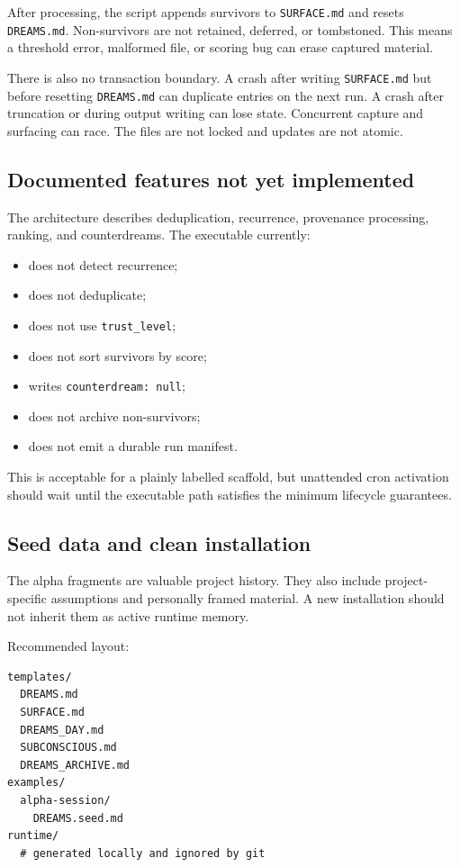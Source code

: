 \documentclass[11pt,a4paper]{article}
\begin{document}
After processing, the script appends survivors to \texttt{SURFACE.md} and resets \texttt{DREAMS.md}. Non-survivors are not retained, deferred, or tombstoned. This means a threshold error, malformed file, or scoring bug can erase captured material.

There is also no transaction boundary. A crash after writing \texttt{SURFACE.md} but before resetting \texttt{DREAMS.md} can duplicate entries on the next run. A crash after truncation or during output writing can lose state. Concurrent capture and surfacing can race. The files are not locked and updates are not atomic.

\subsection{Documented features not yet implemented}

The architecture describes deduplication, recurrence, provenance processing, ranking, and counterdreams. The executable currently:

\begin{itemize}
  \item does not detect recurrence;
  \item does not deduplicate;
  \item does not use \texttt{trust\_level};
  \item does not sort survivors by score;
  \item writes \texttt{counterdream: null};
  \item does not archive non-survivors;
  \item does not emit a durable run manifest.
\end{itemize}

This is acceptable for a plainly labelled scaffold, but unattended cron activation should wait until the executable path satisfies the minimum lifecycle guarantees.

\subsection{Seed data and clean installation}

The alpha fragments are valuable project history. They also include project-specific assumptions and personally framed material. A new installation should not inherit them as active runtime memory.

Recommended layout:

\begin{lstlisting}[language={}]
templates/
  DREAMS.md
  SURFACE.md
  DREAMS_DAY.md
  SUBCONSCIOUS.md
  DREAMS_ARCHIVE.md
examples/
  alpha-session/
    DREAMS.seed.md
runtime/
  # generated locally and ignored by git
\end{lstlisting}
\end{document}
